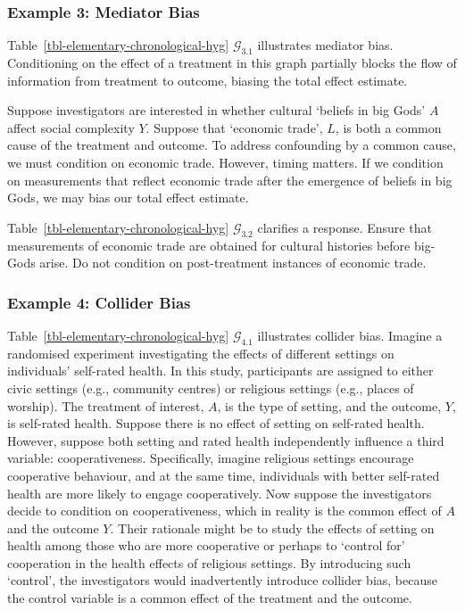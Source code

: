 \documentclass[
  single column]{article}
\begin{document}
\subsubsection{Example 3: Mediator Bias}\label{example-3-mediator-bias}

Table~\ref{tbl-elementary-chronological-hyg} \(\mathcal{G}_{3.1}\)
illustrates mediator bias. Conditioning on the effect of a treatment in
this graph partially blocks the flow of information from treatment to
outcome, biasing the total effect estimate.

Suppose investigators are interested in whether cultural `beliefs in big
Gods' \(A\) affect social complexity \(Y\). Suppose that `economic
trade', \(L\), is both a common cause of the treatment and outcome. To
address confounding by a common cause, we must condition on economic
trade. However, timing matters. If we condition on measurements that
reflect economic trade after the emergence of beliefs in big Gods, we
may bias our total effect estimate.

Table~\ref{tbl-elementary-chronological-hyg} \(\mathcal{G}_{3.2}\)
clarifies a response. Ensure that measurements of economic trade are
obtained for cultural histories before big-Gods arise. Do not condition
on post-treatment instances of economic trade.

\subsubsection{Example 4: Collider Bias}\label{example-4-collider-bias}

Table~\ref{tbl-elementary-chronological-hyg} \(\mathcal{G}_{4.1}\)
illustrates collider bias. Imagine a randomised experiment investigating
the effects of different settings on individuals' self-rated health. In
this study, participants are assigned to either civic settings (e.g.,
community centres) or religious settings (e.g., places of worship). The
treatment of interest, \(A\), is the type of setting, and the outcome,
\(Y\), is self-rated health. Suppose there is no effect of setting on
self-rated health. However, suppose both setting and rated health
independently influence a third variable: cooperativeness. Specifically,
imagine religious settings encourage cooperative behaviour, and at the
same time, individuals with better self-rated health are more likely to
engage cooperatively. Now suppose the investigators decide to condition
on cooperativeness, which in reality is the common effect of \(A\) and
the outcome \(Y\). Their rationale might be to study the effects of
setting on health among those who are more cooperative or perhaps to
`control for' cooperation in the health effects of religious settings.
By introducing such `control', the investigators would inadvertently
introduce collider bias, because the control variable is a common effect
of the treatment and the outcome.
\end{document}
